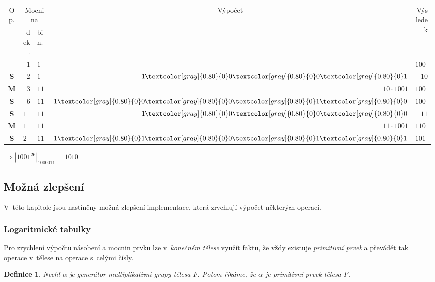 \documentclass[thesis=M,czech,hidelinks]{FITthesis}[2012/06/26]
\newcommand{\0}{{\textcolor[gray]{0.80}{0}}}
\newtheorem{definice}{Definice}
\begin{document}
\begin{center}
    \begin{tabular}{c|r|l|r|r}
        \multirow{2}{*}{Op.} & \multicolumn{2}{c}{Mocnina} & \multicolumn{1}{c}{\multirow{2}{*}{Výpočet}} & \multirow{2}{*}{Výsledek} \\
                &  dek. & bin.    &                   &              \\
        \hline
        \hline
                & $  1$ & $1    $ &                   & $ 1001$      \\
        \hline
    \textbf{S}  & $  2$ & $1    $ & $    1\00\00\01 $ & $   10$      \\
    \textbf{M}  & $  3$ & $11   $ & $ 10 \cdot 1001 $ & $10010$      \\
        \hline
    \textbf{S}  & $  6$ & $110  $ & $ 1\00\00\01\00 $ & $ 1000$      \\
        \hline
    \textbf{S}  & $ 12$ & $1100 $ & $    1\00\00\00 $ & $   11$      \\
    \textbf{M}  & $ 13$ & $1101 $ & $ 11 \cdot 1001 $ & $11011$      \\
        \hline
    \textbf{S}  & $ 26$ & $11010$ & $     1\01\00\01\01 $ & $ 1010$      \\
    \end{tabular}
\end{center}

$ \Rightarrow \left|1001^{26}\right|_{1000011} = 1010 $

\subsection{Možná zlepšení}

V~této kapitole jsou nastíněny možná zlepšení implementace, která zrychlují
výpočet některých operací.

\subsubsection{Logaritmické tabulky}

Pro zrychlení výpočtu násobení a mocnin prvku lze v~\emph{konečném tělese}
využít faktu, že vždy existuje \emph{primitivní prvek} a převádět tak operace
v~tělese na operace s~celými čísly.

\begin{definice}
    Nechť $\alpha$ je \emph{generátor} \emph{multiplikativní grupy} tělesa $F$.
    Potom říkáme, že $\alpha$ je \emph{primitivní prvek} tělesa $F$.
\end{definice}
\end{document}
